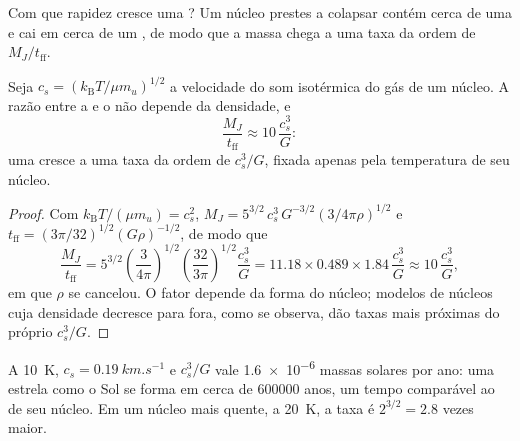 Com que rapidez cresce uma ? Um núcleo prestes a colapsar contém cerca de uma 
e cai em cerca de um , de modo que a massa chega a uma taxa da ordem de
$M_J/t_{\mathrm{ff}}$.

\begin{proposition}
\label{prop:b2:ism-star-formation:accretion}
Seja $c_s = (k_{\mathrm B}T/\mu m_u)^{1/2}$ a velocidade do som isotérmica
do gás de um núcleo. A razão entre a  e o  não
depende da densidade, e
\[
  \frac{M_J}{t_{\mathrm{ff}}} \approx 10\,\frac{c_s^3}{G}:
\]
uma  cresce a uma taxa da ordem de $c_s^3/G$, fixada apenas pela temperatura de seu
núcleo.
\end{proposition}

\begin{proof}
Com $k_{\mathrm B}T/(\mu m_u) = c_s^2$, $M_J = 5^{3/2}\,c_s^3\,G^{-3/2}
(3/4\pi\rho)^{1/2}$ e $t_{\mathrm{ff}} = (3\pi/32)^{1/2}(G\rho)^{-1/2}$, de modo que
\[
  \frac{M_J}{t_{\mathrm{ff}}} = 5^{3/2}\left(\frac{3}{4\pi}\right)^{1/2}
  \left(\frac{32}{3\pi}\right)^{1/2}\frac{c_s^3}{G}
  = 11.18\times0.489\times1.84\,\frac{c_s^3}{G} \approx 10\,\frac{c_s^3}{G},
\]
em que $\rho$ se cancelou. O fator depende da forma do núcleo;
modelos de núcleos cuja densidade decresce para fora, como se observa, dão taxas
mais próximas do próprio $c_s^3/G$.
\end{proof}

A \qty{10}{K}, $c_s = \qty{0.19}{km.s^{-1}}$ e $c_s^3/G$ vale
\num{1.6e-6} massas solares por ano: uma estrela como o Sol se forma em cerca de
\num{600000} anos, um tempo comparável ao  de seu núcleo.
Em um núcleo mais quente, a \qty{20}{K}, a taxa é $2^{3/2} = 2.8$ vezes maior.

